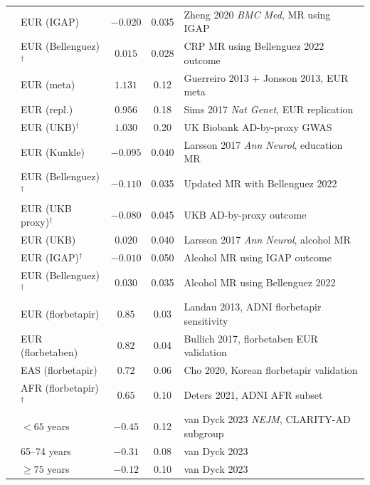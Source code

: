 \documentclass{article}
\begin{document}
\begin{table}[h]
\begin{tabular}{@{}llccp{4.5cm}@{}}
& EUR (IGAP) & $-0.020$ & 0.035 & Zheng 2020 \emph{BMC Med}, MR using IGAP \\
& EUR (Bellenguez)$^\dagger$ & $0.015$ & 0.028 & CRP MR using Bellenguez 2022 outcome \\
\midrule
{}
& EUR (meta) & $1.131$ & 0.12 & Guerreiro 2013 + Jonsson 2013, EUR meta \\
& EUR (repl.) & $0.956$ & 0.18 & Sims 2017 \emph{Nat Genet}, EUR replication \\
& EUR (UKB)$^\dagger$ & $1.030$ & 0.20 & UK Biobank AD-by-proxy GWAS \\
\midrule
{}
& EUR (Kunkle) & $-0.095$ & 0.040 & Larsson 2017 \emph{Ann Neurol}, education MR \\
& EUR (Bellenguez)$^\dagger$ & $-0.110$ & 0.035 & Updated MR with Bellenguez 2022 \\
& EUR (UKB proxy)$^\dagger$ & $-0.080$ & 0.045 & UKB AD-by-proxy outcome \\
\midrule
{}
& EUR (UKB) & $0.020$ & 0.040 & Larsson 2017 \emph{Ann Neurol}, alcohol MR \\
& EUR (IGAP)$^\dagger$ & $-0.010$ & 0.050 & Alcohol MR using IGAP outcome \\
& EUR (Bellenguez)$^\dagger$ & $0.030$ & 0.035 & Alcohol MR using Bellenguez 2022 \\
\midrule
{}
& EUR (florbetapir) & $0.85$ & 0.03 & Landau 2013, ADNI florbetapir sensitivity \\
& EUR (florbetaben) & $0.82$ & 0.04 & Bullich 2017, florbetaben EUR validation \\
& EAS (florbetapir) & $0.72$ & 0.06 & Cho 2020, Korean florbetapir validation \\
& AFR (florbetapir)$^\dagger$ & $0.65$ & 0.10 & Deters 2021, ADNI AFR subset \\
\midrule
{}
& $< 65$ years & $-0.45$ & 0.12 & van Dyck 2023 \emph{NEJM}, CLARITY-AD subgroup \\
& 65--74 years & $-0.31$ & 0.08 & van Dyck 2023 \\
& $\geq 75$ years & $-0.12$ & 0.10 & van Dyck 2023 \\

\end{tabular}
\end{table}
\end{document}
